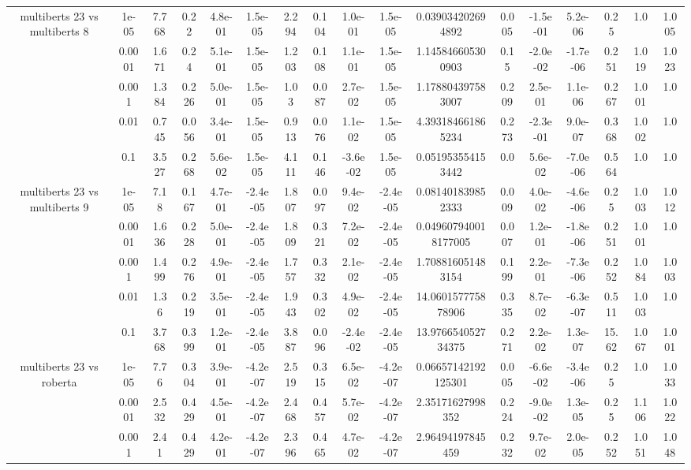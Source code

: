 \begin{tabular}{|c|c|c|c|c|c|c|c|c|c|c|c|c|c|c|c|c|}
\hline
\multirow{5}{*}{multiberts 23 vs multiberts 8} & 1e-05 & 7.768 & 0.22 & 4.8e-01 & 1.5e-05 & 2.294 & 0.104 & 1.0e-01 & 1.5e-05 & 0.039034202694892 & 0.005 & -1.5e-01 & 5.2e-06 & 0.25 & 1.0 & 1.005 \\
 & 0.0001 & 1.671 & 0.24 & 5.1e-01 & 1.5e-05 & 1.203 & 0.108 & 1.1e-01 & 1.5e-05 & 1.145846605300903 & 0.15 & -2.0e-02 & -1.7e-06 & 0.251 & 1.019 & 1.023 \\
 & 0.001 & 1.384 & 0.226 & 5.0e-01 & 1.5e-05 & 1.03 & 0.087 & 2.7e-02 & 1.5e-05 & 1.178804397583007 & 0.209 & 2.5e-01 & 1.1e-06 & 0.267 & 1.001 & 1.0 \\
 & 0.01 & 0.745 & 0.056 & 3.4e-01 & 1.5e-05 & 0.913 & 0.076 & 1.1e-02 & 1.5e-05 & 4.393184661865234 & 0.273 & -2.3e-01 & 9.0e-07 & 0.368 & 1.002 & 1.0 \\
 & 0.1 & 3.527 & 0.268 & 5.6e-02 & 1.5e-05 & 4.111 & 0.146 & -3.6e-02 & 1.5e-05 & 0.051953554153442 & 0.0 & 5.6e-02 & -7.0e-06 & 0.564 & 1.0 & 1.0 \\
\hline
\multirow{5}{*}{multiberts 23 vs multiberts 9} & 1e-05 & 7.18 & 0.167 & 4.7e-01 & -2.4e-05 & 1.807 & 0.097 & 9.4e-02 & -2.4e-05 & 0.081401839852333 & 0.009 & 4.0e-02 & -4.6e-06 & 0.25 & 1.003 & 1.012 \\
 & 0.0001 & 1.636 & 0.228 & 5.0e-01 & -2.4e-05 & 1.809 & 0.321 & 7.2e-02 & -2.4e-05 & 0.049607940018177005 & 0.007 & 1.2e-01 & -1.8e-06 & 0.251 & 1.001 & 1.0 \\
 & 0.001 & 1.499 & 0.276 & 4.9e-01 & -2.4e-05 & 1.757 & 0.332 & 2.1e-02 & -2.4e-05 & 1.708816051483154 & 0.199 & 2.2e-01 & -7.3e-06 & 0.252 & 1.084 & 1.003 \\
 & 0.01 & 1.36 & 0.219 & 3.5e-01 & -2.4e-05 & 1.943 & 0.302 & 4.9e-02 & -2.4e-05 & 14.060157775878906 & 0.335 & 8.7e-02 & -6.3e-07 & 0.511 & 1.003 & 1.0 \\
 & 0.1 & 3.768 & 0.399 & 1.2e-01 & -2.4e-05 & 3.887 & 0.096 & -2.4e-02 & -2.4e-05 & 13.976654052734375 & 0.271 & 2.2e-02 & 1.3e-07 & 15.62 & 1.067 & 1.001 \\
\hline
\multirow{5}{*}{multiberts 23 vs roberta } & 1e-05 & 7.76 & 0.304 & 3.9e-01 & -4.2e-07 & 2.519 & 0.315 & 6.5e-02 & -4.2e-07 & 0.06657142192125301 & 0.005 & -6.6e-02 & -3.4e-06 & 0.25 & 1.0 & 1.033 \\
 & 0.0001 & 2.532 & 0.429 & 4.5e-01 & -4.2e-07 & 2.468 & 0.457 & 5.7e-02 & -4.2e-07 & 2.35171627998352 & 0.224 & -9.0e-02 & 1.3e-05 & 0.25 & 1.106 & 1.022 \\
 & 0.001 & 2.41 & 0.429 & 4.2e-01 & -4.2e-07 & 2.396 & 0.465 & 4.7e-02 & -4.2e-07 & 2.96494197845459 & 0.232 & 9.7e-02 & 2.0e-05 & 0.252 & 1.051 & 1.048 \\

\end{tabular}

